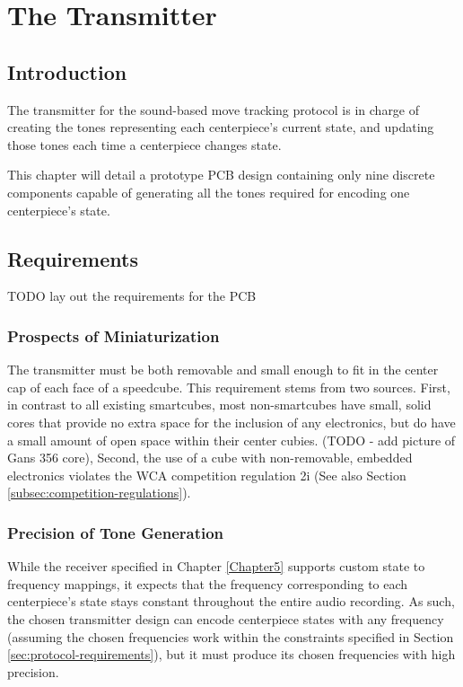 
\chapter{The Transmitter} %
\label{Chapter6} 


\section{Introduction}
The transmitter for the sound-based move tracking protocol is in charge of creating the tones representing each centerpiece's current state, and updating those tones each time a centerpiece changes state.

This chapter will detail a prototype PCB design containing only nine discrete components capable of generating all the tones required for encoding one centerpiece's state.

\section{Requirements}
\label{sec:transmitter-requirements}

TODO lay out the requirements for the PCB

\subsection{Prospects of Miniaturization}
\label{subsec:prospects-of-miniaturization}
The transmitter must be both removable and small enough to fit in the center cap of each face of a speedcube.
This requirement stems from two sources.
First, in contrast to all existing smartcubes, most non-smartcubes have small, solid cores that provide no extra space for the inclusion of any electronics, but do have a small amount of open space within their center cubies. (TODO - add picture of Gans 356 core), 
Second, the use of a cube with non-removable, embedded electronics violates the WCA competition regulation 2i \cite{wca-regulations} (See also Section \ref{subsec:competition-regulations}).

\subsection{Precision of Tone Generation}
\label{subsec:precision-of-tone-generation}
While the receiver specified in Chapter \ref{Chapter5} supports custom state to frequency mappings, it expects that the frequency corresponding to each centerpiece's state stays constant throughout the entire audio recording.
As such, the chosen transmitter design can encode centerpiece states with any frequency (assuming the chosen frequencies work within the constraints specified in Section \ref{sec:protocol-requirements}), but it must produce its chosen frequencies with high precision.

